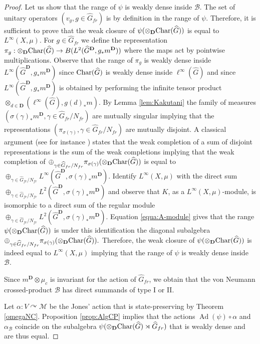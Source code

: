 \documentclass[a4paper,12pt]{amsart}
\numberwithin{equation}{section}
\theoremstyle{definition}
\newcommand{\act}{\curvearrowright}
\newcommand{\al}{\alpha}
\DeclareMathOperator{\Ad}{Ad}
\newcommand{\scrB}{\mathscr B}
\newcommand{\Ch}{\textup{Char}}
\newcommand{\D}{\mathbf D}
\newcommand{\ga}{\gamma}
\newcommand{\scrM}{\mathscr M}
\newcommand{\ot}{\otimes}\newcommand{\otmin}{\otimes_{\text{min}}}
\newcommand{\wh}{\widehat}
\begin{document}
\begin{proof}
Let us show that the range of $\psi$ is weakly dense inside $\scrB$.
The set of unitary operators $(v_g,g\in\wh G_{fr})$ is by definition in the range of $\psi$.
Therefore, it is sufficient to prove that the weak closure of $\psi(\ot_\D \Ch(\wh G))$ is equal to $L^\infty(X,\mu).$
For $g\in \wh G_{fr}$ we define the representation $\pi_g:\ot_\D \Ch(\wh G)\to B(L^2({\wh G}^\D,g_*m^\D))$ where the maps act by pointwise multiplications.
Observe that the range of $\pi_g$ is weakly dense inside $L^\infty({\wh G}^\D,g_*m^\D)$ since $\Ch(\wh G)$ is weakly dense inside $\ell^\infty(\wh G)$ and since $L^\infty({\wh G}^\D,g_*m^\D)$ is obtained by performing the infinite tensor product $\ot_{d\in\D} (\ell^\infty(\wh G), g(d)_* m)$.
By Lemma \ref{lem:Kakutani} the family of measures $(\sigma(\ga)_* m^\D, \ga\in \wh G_{fr}/N_{fr})$ are mutually singular implying that the representations $(\pi_{\sigma(\ga)} ,\ga \in \wh G_{fr} /N_{fr} )$ are mutually disjoint.
A classical argument (see for instance \cite[Chapter 2]{Arveson76}) states that the weak completion of a sum of disjoint representations is the sum of the weak completions implying that the weak completion of $\oplus_{\ga \in \wh G_{fr} /N_{fr} } \pi_{\sigma(\ga)} (\ot_\D \Ch(\wh G))$ is equal to $\oplus_{\ga \in \wh G_{fr} /N_{fr} } L^\infty({\wh G}^\D,\sigma(\ga)_*m^\D)$. 
Identify $L^\infty(X,\mu)$ with the direct sum $\oplus_{\ga\in\wh G_{fr}/N_{fr}} L^2({\wh G}^\D, \sigma(\ga)_* m^\D)$ and observe that $K$, as a $L^\infty(X,\mu)$-module, is isomorphic to a direct sum of the regular module $\oplus_{\ga\in\wh G_{fr}/N_{fr}} L^2({\wh G}^\D, \sigma(\ga)_* m^\D)$.
Equation \ref{equa:A-module} gives that the range $\psi(\ot_\D \Ch(\wh G))$ is under this identification the diagonal subalgebra $\oplus_{\ga \in   \wh G_{fr}/N_{fr} } \pi_{\sigma(\ga)}(\ot_\D \Ch(\wh G)).$
Therefore, the weak closure of $\psi(\ot_\D \Ch(\wh G))$ is indeed equal to $L^\infty(X,\mu)$ implying that the range of $\psi$ is weakly dense inside $\scrB.$

Since $m^\D\ot \mu_c$ is invariant for the action of $\wh G_{fr}$, we obtain that the von Neumann crossed-product $\scrB$ has direct summands of type I or II.

Let $\al:V\act \scrM$ be the Jones' action that is state-preserving by Theorem \ref{omegaNC}.
Proposition \ref{prop:AlgCP} implies that the actions $\Ad(\psi)\circ \al$ and $\al_\scrB$ coincide on the subalgebra $\psi(\ot_\D  \Ch(\wh G)\rtimes \wh G_{fr})$ that is weakly dense and are thus equal.


\end{proof}
\end{document}
